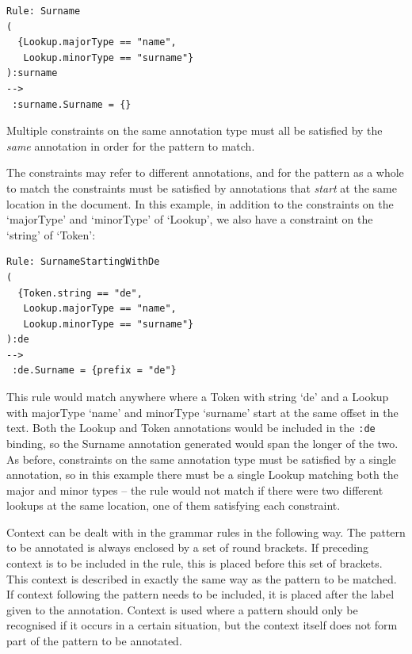 \begin{small}
\begin{verbatim}
Rule: Surname
(
  {Lookup.majorType == "name",
   Lookup.minorType == "surname"}
):surname
-->
 :surname.Surname = {}
\end{verbatim}
\end{small}

Multiple constraints on the same annotation type must all be satisfied by the
{\em same} annotation in order for the pattern to match.

The constraints may refer to different annotations, and for the pattern as a
whole to match the constraints must be satisfied by annotations that
{\em start} at the same location in the document. In this example, in
addition to the constraints on the `majorType' and `minorType' of `Lookup', we
also have a constraint on the `string' of `Token':

\begin{small}
\begin{verbatim}
Rule: SurnameStartingWithDe
(
  {Token.string == "de",
   Lookup.majorType == "name",
   Lookup.minorType == "surname"}
):de
-->
 :de.Surname = {prefix = "de"}
\end{verbatim}
\end{small}

This rule would match anywhere where a Token with string `de' and a Lookup
with majorType `name' and minorType `surname' start at the same offset in
the text.  Both the Lookup and Token annotations would be included in the
\verb|:de| binding, so the Surname annotation generated would span the longer
of the two.  As before, constraints on the same annotation type must be
satisfied by a single annotation, so in this example there must be a single
Lookup matching both the major and minor types -- the rule would not match if
there were two different lookups at the same location, one of them satisfying
each constraint.


Context can be dealt with in the grammar rules in the following way.
The pattern to be annotated is always enclosed by a set of round
brackets. If preceding context is to be included in the rule, this is
placed before this set of brackets. This context is described in
exactly the same way as the pattern to be matched. If context
following the pattern needs to be included, it is placed after the
label given to the annotation. Context is used where a pattern should
only be recognised if it occurs in a certain situation, but the
context itself does not form part of the pattern to be annotated.

